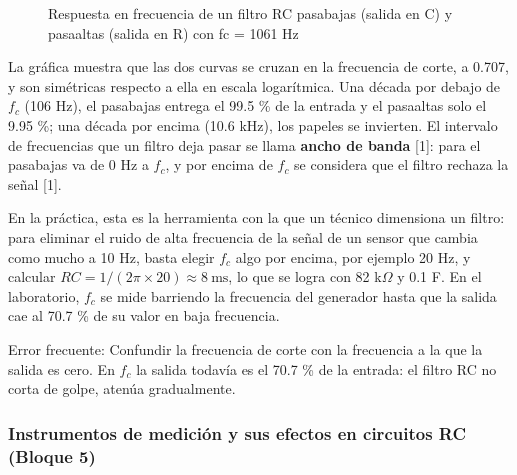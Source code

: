 \documentclass[11pt,letterpaper]{article}
\begin{document}
\begin{figure}[H]
  \caption{Respuesta en frecuencia de un filtro RC pasabajas (salida en C) y pasaaltas (salida en R) con fc = 1061 Hz}
\end{figure}

La gráfica muestra que las dos curvas se cruzan en la frecuencia de corte, a 0.707, y son simétricas respecto a ella en escala logarítmica. Una década por debajo de $f_c$ (106 Hz), el pasabajas entrega el 99.5 \% de la entrada y el pasaaltas solo el 9.95 \%; una década por encima (10.6 kHz), los papeles se invierten. El intervalo de frecuencias que un filtro deja pasar se llama \textbf{ancho de banda} [1]: para el pasabajas va de 0 Hz a $f_c$, y por encima de $f_c$ se considera que el filtro rechaza la señal [1].

En la práctica, esta es la herramienta con la que un técnico dimensiona un filtro: para eliminar el ruido de alta frecuencia de la señal de un sensor que cambia como mucho a 10 Hz, basta elegir $f_c$ algo por encima, por ejemplo 20 Hz, y calcular $RC = 1/(2\pi \times 20) \approx 8\ \text{ms}$, lo que se logra con 82 k\ensuremath{\Omega} y 0.1 \textmu{}F. En el laboratorio, $f_c$ se mide barriendo la frecuencia del generador hasta que la salida cae al 70.7 \% de su valor en baja frecuencia.

\begin{nota}{Error frecuente:}
Confundir la frecuencia de corte con la frecuencia a la que la salida es cero. En $f_c$ la salida todavía es el 70.7 \% de la entrada: el filtro RC no corta de golpe, atenúa gradualmente.
\end{nota}

\subsubsection{Instrumentos de medición y sus efectos en circuitos RC (Bloque 5)}
\end{document}
